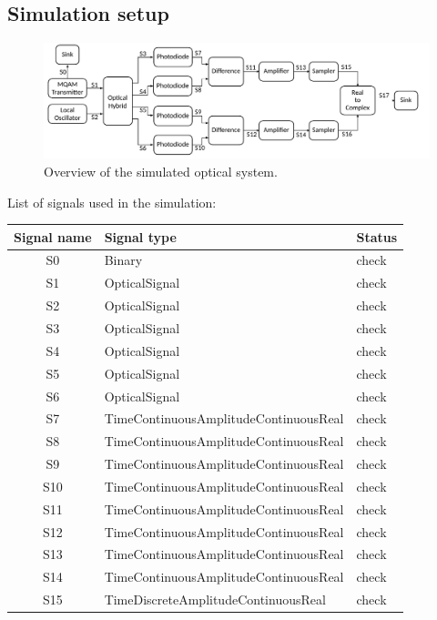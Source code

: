 \begin{bibunit}[plain]
\subsection{Simulation setup}

\begin{figure}[H]
\centering
\includegraphics[width=\linewidth]{./sdf/optical_detection/figures/scheme_setup.pdf}
\caption{Overview of the simulated optical system.}
\label{fig:setup}
\end{figure}
%
\vspace{1em}
%
List of signals used in the simulation:
\begin{table}[H]
\centering
\begin{tabular}{|c|l|l|}
\hline
\bf{Signal name}	& \bf{Signal type}						& \bf{Status}\\
\hline
S0					& Binary								& check\\
S1					& OpticalSignal							& check\\
S2					& OpticalSignal							& check\\
S3					& OpticalSignal							& check\\
S4					& OpticalSignal							& check\\
S5					& OpticalSignal							& check\\
S6					& OpticalSignal							& check\\
S7					& TimeContinuousAmplitudeContinuousReal	& check\\
S8					& TimeContinuousAmplitudeContinuousReal	& check\\
S9					& TimeContinuousAmplitudeContinuousReal	& check\\
S10					& TimeContinuousAmplitudeContinuousReal	& check\\
S11					& TimeContinuousAmplitudeContinuousReal	& check\\
S12					& TimeContinuousAmplitudeContinuousReal	& check\\
S13					& TimeContinuousAmplitudeContinuousReal	& check\\
S14					& TimeContinuousAmplitudeContinuousReal	& check\\
S15					& TimeDiscreteAmplitudeContinuousReal	& check\\

\end{tabular}
\end{table}
\end{bibunit}
